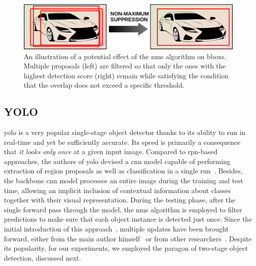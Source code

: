 \begin{figure}[t]
    \centerline{\includegraphics[width=0.6\linewidth]{figures/theoretical_foundations/non_maximum_suppression.pdf}}
    \caption[\Gls{nms} visualization]{An illustration of a potential effect of the \gls{nms} algorithm on \glspl{bbox}. Multiple proposals (left) are filtered so that only the ones with the highest detection score (right) remain while satisfying the condition that the overlap does not exceed a specific threshold.}
    \label{fig:NonMaximumSuppression}
\end{figure}

\subsection{YOLO}
\label{ssec:YouLookOnlyOnce}

\Gls{yolo} is a very popular single-stage object detector thanks to its ability to run in real-time and yet be sufficiently accurate. Its speed is primarily a consequence that \emph{it looks only once} at a given input image. Compared to \gls{rpn}-based approaches, the authors of \gls{yolo} devised a \gls{cnn} model capable of performing extraction of region proposals as well as classification in a single run~\cite{redmon2016yolo}. Besides, the backbone \gls{cnn} model processes an entire image during the training and test time, allowing an implicit inclusion of contextual information about classes together with their visual representation. During the testing phase, after the single forward pass through the model, the \gls{nms} algorithm is employed to filter predictions to make sure that each object instance is detected just once. Since the initial introduction of this approach~\cite{redmon2016yolo}, multiple updates have been brought forward, either from the main author himself~\cite{redmon2017yolo9000, redmon2018yolov3} or from other researchers~\cite{wang2020yolov4, wong2019yolonano}. Despite its popularity, for our experiments, we employed the paragon of two-stage object detection, discussed next.

